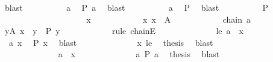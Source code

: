 \begin{isabellebody}
\ blast\isanewline
\ \ \ \ \ \ \ \ \isamarkupfalse%
\ a\ \isamarkupfalse%
\ {\isachardoublequoteopen}P\ a{\isachardoublequoteclose}\ \isamarkupfalse%
\ blast\isanewline
\ \ \ \ \ \ \ \ \isamarkupfalse%
\ a\ \isamarkupfalse%
\ {\isacharquery}{\kern0pt}P{}\ \isamarkupfalse%
\ blast\isanewline
\ \ \ \ \ \ \ \ \isamarkupfalse%
\ {\isacharquery}{\kern0pt}P{}\isanewline
\ \ \ \ \ \ \ \ \isamarkupfalse%
\isanewline
\ \ \ \ \ \ \ \ \ \ \isamarkupfalse%
\ x\isanewline
\ \ \ \ \ \ \ \ \ \ \isamarkupfalse%
\ x{\isacharcolon}{\kern0pt}\ {\isachardoublequoteopen}x\ {\isasymin}\ A{\isachardoublequoteclose}\isanewline
\ \ \ \ \ \ \ \ \ \ \isamarkupfalse%
\ chain\ a\ \isamarkupfalse%
\ {\isachardoublequoteopen}{\isasymexists}y{\isasymin}A{\isachardot}{\kern0pt}\ x\ {\isasymle}\ y\ {\isasymand}\ P\ y{\isachardoublequoteclose}\isanewline
\ \ \ \ \ \ \ \ \ \ \isamarkupfalse%
\ {\isacharparenleft}{\kern0pt}rule\ chainE{\isacharparenright}{\kern0pt}\isanewline
\ \ \ \ \ \ \ \ \ \ \ \ \isamarkupfalse%
\ le{\isacharcolon}{\kern0pt}\ {\isachardoublequoteopen}a\ {\isasymle}\ x{\isachardoublequoteclose}\isanewline
\ \ \ \ \ \ \ \ \ \ \ \ \isamarkupfalse%
\ {\isacharasterisk}{\kern0pt}\ a\ x\ \isamarkupfalse%
\ {\isachardoublequoteopen}P\ x{\isachardoublequoteclose}\ \isamarkupfalse%
\ blast\isanewline
\ \ \ \ \ \ \ \ \ \ \ \ \isamarkupfalse%
\ x\ le\ \isamarkupfalse%
\ {\isacharquery}{\kern0pt}thesis\ \isamarkupfalse%
\ blast\isanewline
\ \ \ \ \ \ \ \ \ \ \isamarkupfalse%
\isanewline
\ \ \ \ \ \ \ \ \ \ \ \ \isamarkupfalse%
\ {\isachardoublequoteopen}a\ {\isasymge}\ x{\isachardoublequoteclose}\isanewline
\ \ \ \ \ \ \ \ \ \ \ \ \isamarkupfalse%
\ a\ {\isacartoucheopen}P\ a{\isacartoucheclose}\ \isamarkupfalse%
\ {\isacharquery}{\kern0pt}thesis\ \isamarkupfalse%
\ blast\isanewline
\ \ \ \ \ \ \ \ \ \ \isamarkupfalse%
\isanewline
\ \ \ \ \ \ \ \ \isamarkupfalse%
\isanewline
\ \ \ \ \ \ \isamarkupfalse%
\isanewline
\ \ \ \ \isamarkupfalse%
\isanewline
\ \ \isamarkupfalse%
\isanewline
\ \ \isamarkupfalse%
\isanewline
\ \ \isamarkupfalse%

\end{isabellebody}
